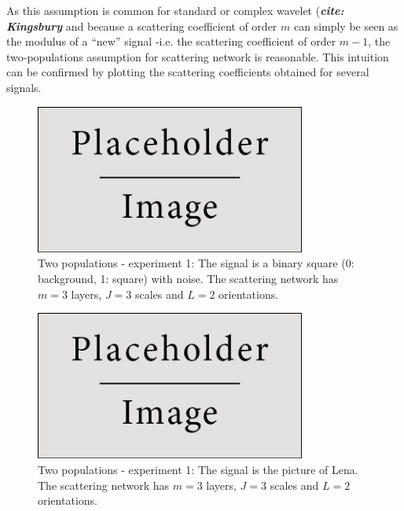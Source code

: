 \documentclass[a4paper,11pt]{report}
\begin{document}
{    As this assumption is common for standard or complex wavelet (\textbf{\textit{cite: Kingsbury}} and because a scattering coefficient of order $m$ can simply be seen as the modulus of a ``new'' signal -i.e. the scattering coefficient of order $m-1$, the two-populations assumption for scattering network is reasonable. This intuition can be confirmed by plotting the scattering coefficients obtained for several signals.\\
    
		\begin{figure}
				\begin{center}
					\includegraphics[width=3.5in]{placeholder.jpg}
					\caption[Two populations - experiment 1.]{Two populations - experiment 1: The signal is a binary square (0: background, 1: square) with noise. The scattering network has $m=3$ layers, $J=3$ scales and $L=2$ orientations.} %
					\label{fig:2pop - 1}
				\end{center}
		\end{figure}    
		
		\begin{figure}
				\begin{center}
					\includegraphics[width=3.5in]{placeholder.jpg}
					\caption[Two populations - experiment 2.]{Two populations - experiment 1: The signal is the picture of Lena. The scattering network has $m=3$ layers, $J=3$ scales and $L=2$ orientations.} %
					\label{fig:2pop - 2}
				\end{center}
		\end{figure}
		
}
\end{document}
